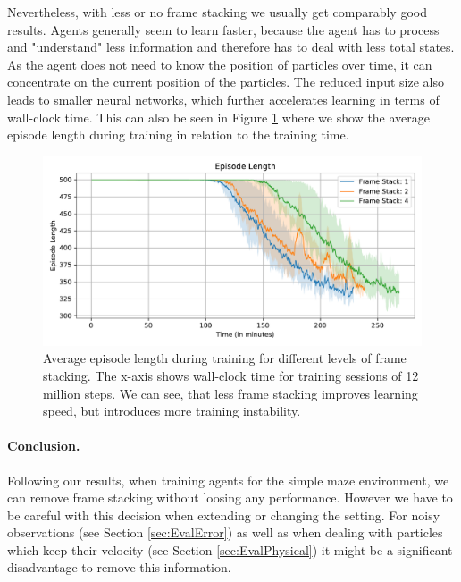 Nevertheless, with less or no frame stacking we usually get comparably good results. Agents generally seem to learn faster, because the agent has to process and "understand" less information and therefore has to deal with less total states. As the agent does not need to know the position of particles over time, it can concentrate on the current position of the particles. The reduced input size also leads to smaller neural networks, which further accelerates learning in terms of wall-clock time. This can also be seen in Figure \ref{fig:Eval/FrameStacking/Maze0122} where we show the average episode length during training in relation to the training time. 

\begin{figure}[htp]
    \begin{center}
        \includegraphics[clip, width=0.8\columnwidth]{figures/evaluation/observations/maze0122_frame_stack_ep_len.pdf}
    \end{center}
    \caption[Average Training Episode Length for Different Levels of Frame Stacking]{Average episode length during training for different levels of frame stacking. The x-axis shows wall-clock time for training sessions of 12 million steps. We can see, that less frame stacking improves learning speed, but introduces more training instability.} \label{fig:Eval/FrameStacking/Maze0122}
\end{figure}

\paragraph{Conclusion. } Following our results, when training agents for the simple maze environment, we can remove frame stacking without loosing any performance. However we have to be careful with this decision when extending or changing the setting. For noisy observations (see Section \ref{sec:EvalError}) as well as when dealing with particles which keep their velocity (see Section \ref{sec:EvalPhysical}) it might be a significant disadvantage to remove this information. 


